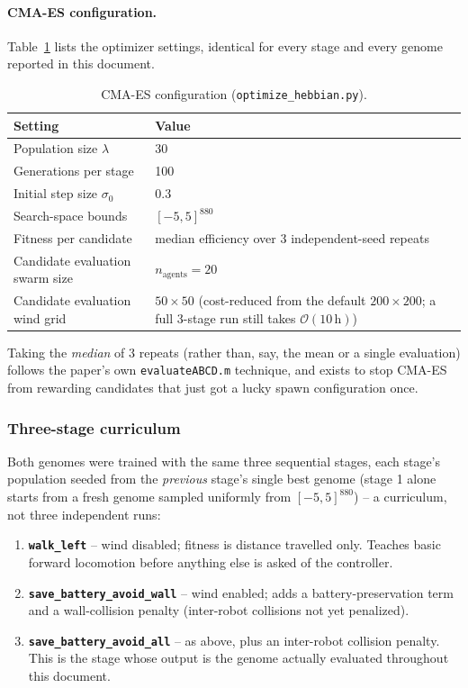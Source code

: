 \documentclass[11pt]{article}
\begin{document}
\paragraph{CMA-ES configuration.} Table~\ref{tab:cmaes} lists the optimizer settings, identical
for every stage and every genome reported in this document.

\begin{table}[h]
\centering
\caption{CMA-ES configuration (\texttt{optimize\_hebbian.py}).}
\label{tab:cmaes}
\begin{tabular}{@{}ll@{}}
\toprule
Setting & Value \\
\midrule
Population size $\lambda$ & 30 \\
Generations per stage & 100 \\
Initial step size $\sigma_0$ & 0.3 \\
Search-space bounds & $[-5, 5]^{880}$ \\
Fitness per candidate & median efficiency over 3 independent-seed repeats \\
Candidate evaluation swarm size & $n_{\text{agents}}=20$ \\
Candidate evaluation wind grid & $50\times50$ (cost-reduced from the default $200\times200$; a full 3-stage run still takes $\mathcal{O}(10\,\text{h})$) \\
\bottomrule
\end{tabular}
\end{table}

Taking the \emph{median} of 3 repeats (rather than, say, the mean or a single evaluation) follows
the paper's own \texttt{evaluateABCD.m} technique, and exists to stop CMA-ES from rewarding
candidates that just got a lucky spawn configuration once.

\subsubsection{Three-stage curriculum}
\label{sec:curriculum}
Both genomes were trained with the same three sequential stages, each stage's population
seeded from the \emph{previous} stage's single best genome (stage 1 alone starts from a fresh
genome sampled uniformly from $[-5,5]^{880}$) -- a curriculum, not three independent runs:

\begin{enumerate}
\item \textbf{\texttt{walk\_left}} -- wind disabled; fitness is distance travelled only. Teaches
  basic forward locomotion before anything else is asked of the controller.
\item \textbf{\texttt{save\_battery\_avoid\_wall}} -- wind enabled; adds a battery-preservation
  term and a wall-collision penalty (inter-robot collisions not yet penalized).
\item \textbf{\texttt{save\_battery\_avoid\_all}} -- as above, plus an inter-robot collision
  penalty. This is the stage whose output is the genome actually evaluated throughout this
  document.
\end{enumerate}
\end{document}
